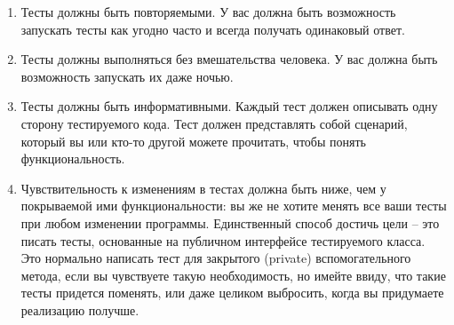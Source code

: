 \documentclass[a4paper,10pt,twoside]{book}
\begin{document}
\begin{enumerate}
\item Тесты должны быть повторяемыми. У вас должна быть возможность запускать тесты как угодно часто
и всегда получать одинаковый ответ.
\item Тесты должны выполняться без вмешательства человека. У вас должна быть возможность запускать их даже ночью.
\item Тесты должны быть информативными. Каждый тест должен описывать одну сторону тестируемого кода.
Тест должен представлять собой сценарий, который вы или кто-то другой можете прочитать,
чтобы понять функциональность.
\label{prop:oneAspect}
\item Чувствительность к изменениям в тестах должна быть ниже, чем у покрываемой ими функциональности:
вы же не хотите менять все ваши тесты при любом изменении программы.
Единственный способ достичь цели – это писать тесты, основанные на публичном интерфейсе тестируемого класса.
Это нормально написать тест для закрытого (private) вспомогательного метода,
если вы чувствуете такую необходимость,
но имейте ввиду, что такие тесты придется поменять, или даже целиком выбросить,
когда вы придумаете реализацию получше.
\end{enumerate}
\end{document}
